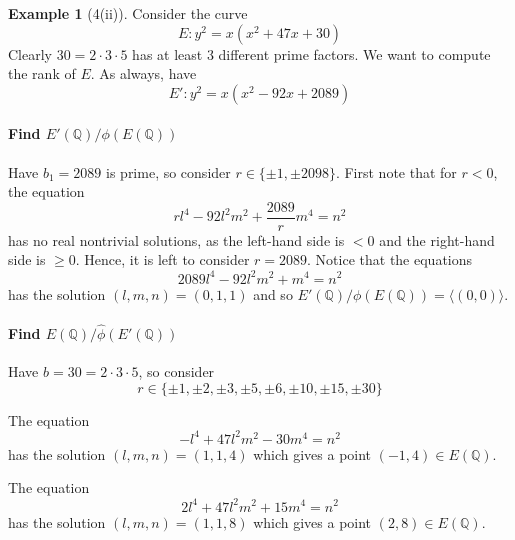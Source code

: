 \documentclass{scrartcl}
\newcommand{\Q}{\mathbb{Q}}
\theoremstyle{definition}
\newtheorem{example}[subsection]{Example}
\begin{document}
\begin{example}[4(ii)]
    \label{ex:special_curve}
    Consider the curve
    \begin{equation*}
        E: y^2 = x(x^2 + 47 x + 30)
    \end{equation*}
    Clearly $30 = 2 \cdot 3 \cdot 5$ has at least 3 different prime factors.
    We want to compute the rank of $E$.
    As always, have
    \begin{equation*}
        E': y^2 = x(x^2 - 92 x + 2089)
    \end{equation*}

    \paragraph{Find $E'(\Q)/\phi(E(\Q))$} Have $b_1 = 2089$ is prime, so consider $r \in \{ \pm 1, \pm 2098 \}$.
    First note that for $r < 0$, the equation
    \begin{equation*}
        r l^4 - 92 l^2 m^2 + \frac {2089} r m^4 = n^2
    \end{equation*}
    has no real nontrivial solutions, as the left-hand side is $< 0$ and the right-hand side is $\geq 0$.
    Hence, it is left to consider $r = 2089$.
    Notice that the equations
    \begin{equation*}
        2089 l^4 - 92 l^2 m^2 + m^4 = n^2
    \end{equation*}
    has the solution $(l, m, n) = (0, 1, 1)$ and so $E'(\Q)/\phi(E(\Q)) = \langle (0, 0) \rangle$.

    \paragraph{Find $E(\Q)/\hat{\phi}(E'(\Q))$} Have $b = 30 = 2 \cdot 3 \cdot 5$, so consider
    \begin{equation*}
        r \in \{ \pm 1, \pm 2, \pm 3, \pm 5, \pm 6, \pm 10, \pm 15, \pm 30 \}
    \end{equation*}

    The equation
    \begin{equation*}
        -l^4 + 47 l^2 m^2 - 30 m^4 = n^2
    \end{equation*}
    has the solution $(l, m, n) = (1, 1, 4)$ which gives a point $(-1, 4) \in E(\Q)$.

    The equation
    \begin{equation*}
        2l^4 + 47 l^2 m^2 + 15 m^4 = n^2
    \end{equation*}
    has the solution $(l, m, n) = (1, 1, 8)$ which gives a point $(2, 8) \in E(\Q)$.


\end{example}
\end{document}
